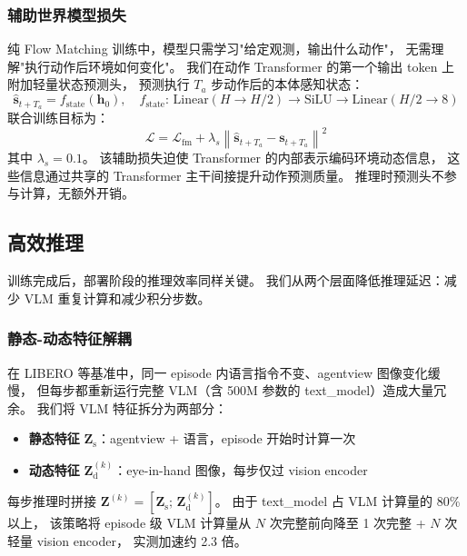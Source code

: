 \documentclass[10pt,twocolumn]{ctexart}
\begin{document}
\subsubsection{辅助世界模型损失}

纯 Flow Matching 训练中，模型只需学习"给定观测，输出什么动作"，
无需理解"执行动作后环境如何变化"。
我们在动作 Transformer 的第一个输出 token 上附加轻量状态预测头，
预测执行 $T_a$ 步动作后的本体感知状态：
\begin{equation}
    \hat{\mathbf{s}}_{t+T_a} = f_\text{state}(\mathbf{h}_0), \quad
    f_\text{state}\text{: Linear}(H \to H/2) \to \text{SiLU} \to \text{Linear}(H/2 \to 8)
\end{equation}
联合训练目标为：
\begin{equation}\label{eq:total_loss}
    \mathcal{L} = \mathcal{L}_\text{fm} + \lambda_s \left\|\hat{\mathbf{s}}_{t+T_a} - \mathbf{s}_{t+T_a}\right\|^2
\end{equation}
其中 $\lambda_s = 0.1$。
该辅助损失迫使 Transformer 的内部表示编码环境动态信息，
这些信息通过共享的 Transformer 主干间接提升动作预测质量。
推理时预测头不参与计算，无额外开销。

\subsection{高效推理}\label{sec:inference}

训练完成后，部署阶段的推理效率同样关键。
我们从两个层面降低推理延迟：减少 VLM 重复计算和减少积分步数。

\subsubsection{静态-动态特征解耦}

在 LIBERO 等基准中，同一 episode 内语言指令不变、agentview 图像变化缓慢，
但每步都重新运行完整 VLM（含 500M 参数的 text\_model）造成大量冗余。
我们将 VLM 特征拆分为两部分：

\begin{itemize}[leftmargin=*,noitemsep]
    \item \textbf{静态特征} $\mathbf{Z}_\text{s}$：agentview + 语言，episode 开始时计算一次
    \item \textbf{动态特征} $\mathbf{Z}_\text{d}^{(k)}$：eye-in-hand 图像，每步仅过 vision encoder
\end{itemize}

每步推理时拼接 $\mathbf{Z}^{(k)} = [\mathbf{Z}_\text{s};\, \mathbf{Z}_\text{d}^{(k)}]$。
由于 text\_model 占 VLM 计算量的 80\% 以上，
该策略将 episode 级 VLM 计算量从 $N$ 次完整前向降至 1 次完整 + $N$ 次轻量 vision encoder，
实测加速约 2.3 倍。
\end{document}
